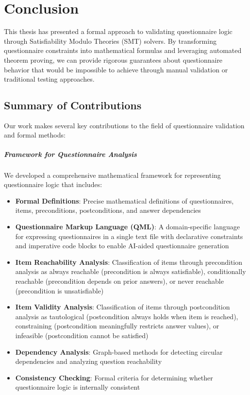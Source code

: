 \chapter{Conclusion}
\label{ch:closing}

This thesis has presented a formal approach to validating questionnaire logic through Satisfiability Modulo Theories (SMT) solvers. By transforming questionnaire constraints into mathematical formulas and leveraging automated theorem proving, we can provide rigorous guarantees about questionnaire behavior that would be impossible to achieve through manual validation or traditional testing approaches.

\section{Summary of Contributions}

Our work makes several key contributions to the field of questionnaire validation and formal methods:

\paragraph{Framework for Questionnaire Analysis}

We developed a comprehensive mathematical framework for representing questionnaire logic that includes:

\begin{itemize}
    \item \textbf{Formal Definitions}: Precise mathematical definitions of questionnaires, items, preconditions, postconditions, and answer dependencies
    \item \textbf{Questionnaire Markup Language (QML)}: A domain-specific language for expressing questionnaires in a single text file with declarative constraints and imperative code blocks to enable AI-aided questionnaire generation
    \item \textbf{Item Reachability Analysis}: Classification of items through precondition analysis as always reachable (precondition is always satisfiable), conditionally reachable (precondition depends on prior answers), or never reachable (precondition is unsatisfiable)
    \item \textbf{Item Validity Analysis}: Classification of items through postcondition analysis as tautological (postcondition always holds when item is reached), constraining (postcondition meaningfully restricts answer values), or infeasible (postcondition cannot be satisfied)
    \item \textbf{Dependency Analysis}: Graph-based methods for detecting circular dependencies and analyzing question reachability
    \item \textbf{Consistency Checking}: Formal criteria for determining whether questionnaire logic is internally consistent
\end{itemize}

